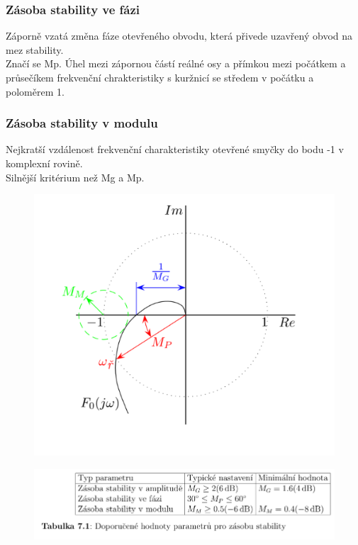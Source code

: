 \subsubsection*{Zásoba stability ve fázi}
Záporně vzatá změna fáze otevřeného obvodu, která přivede uzavřený obvod na mez stability.\\
Značí se Mp. Úhel mezi zápornou částí reálné osy a přímkou mezi počátkem a průsečíkem frekvenční chrakteristiky s kuržnicí se středem v počátku a poloměrem 1.\\

\subsubsection*{Zásoba stability v modulu}
Nejkratší vzdálenost frekvenční charakteristiky otevřené smyčky do bodu -1 v komplexní rovině.\\
Silnější kritérium než Mg a Mp.\\

\begin{figure}[H]
    \centering
    \includegraphics*[scale = 1.2]{images/zasobaStabiliity.png}
\end{figure}
\begin{figure}[H]
    \includegraphics*[scale = 1.1]{images/zasobaStabiliityTabulka.png}
\end{figure}


